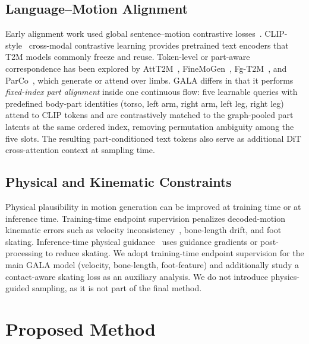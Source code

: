 \documentclass[journal]{IEEEtran}
\begin{document}
\subsection{Language--Motion Alignment}
\label{sec:rw-align}

Early alignment work used global sentence--motion contrastive losses~\cite{guo2022humanml3d,guo2022tm2t,petrovich2022temos,petrovich2021actor}. CLIP-style~\cite{radford2021clip} cross-modal contrastive learning provides pretrained text encoders that T2M models commonly freeze and reuse. Token-level or part-aware correspondence has been explored by AttT2M~\cite{zhong2023att2m}, FineMoGen~\cite{zhang2023finemogen}, Fg-T2M~\cite{chen2023fg2tm}, and ParCo~\cite{zou2024parco}, which generate or attend over limbs. GALA differs in that it performs \emph{fixed-index part alignment} inside one continuous flow: five learnable queries with predefined body-part identities (torso, left arm, right arm, left leg, right leg) attend to CLIP tokens and are contrastively matched to the graph-pooled part latents at the same ordered index, removing permutation ambiguity among the five slots. The resulting part-conditioned text tokens also serve as additional DiT cross-attention context at sampling time.

\subsection{Physical and Kinematic Constraints}
\label{sec:rw-phys}

Physical plausibility in motion generation can be improved at training time or at inference time. Training-time endpoint supervision penalizes decoded-motion kinematic errors such as velocity inconsistency~\cite{tevet2023mdm}, bone-length drift, and foot skating. Inference-time physical guidance~\cite{zhou2024emdm} uses guidance gradients or post-processing to reduce skating. We adopt training-time endpoint supervision for the main GALA model (velocity, bone-length, foot-feature) and additionally study a contact-aware skating loss as an auxiliary analysis. We do not introduce physics-guided sampling, as it is not part of the final method.

\section{Proposed Method}
\end{document}
